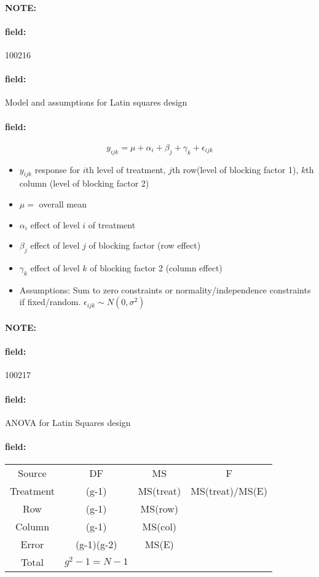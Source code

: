 \documentclass[12pt]{article}
\newenvironment{note}{\paragraph{NOTE:}}{}
\newenvironment{field}{\paragraph{field:}}{}
\begin{document}
\begin{note}
    \begin{field}
        \tiny 100216
    \end{field}
    \begin{field}
        Model and assumptions for Latin squares design
    \end{field}
    \begin{field}
        $$y_{ijk} = \mu +\alpha_i + \beta_j + \gamma_k + \epsilon_{ijk} $$
        \begin{itemize}
          \item $y_{ijk}$ response for $i$th level of treatment, $j$th row(level of blocking factor 1), $k$th column (level of blocking factor 2)
          \item $\mu = $ overall mean
          \item $\alpha_i$ effect of level $i$ of treatment
          \item $\beta_j$ effect of level $j$ of blocking factor (row effect)
          \item $\gamma_k$ effect of level $k$ of blocking factor 2 (column effect)
          \item Assumptions: Sum to zero constraints or normality/independence constraints if fixed/random. $\epsilon_{ijk} \sim N(0,\sigma^2)$
        \end{itemize}
    \end{field}
\end{note}

\begin{note}
    \begin{field}
        \tiny 100217
    \end{field}
    \begin{field}
        ANOVA for Latin Squares design
    \end{field}
    \begin{field}
        \begin{tabular}{c c c c }
          Source & DF & MS & F \\
          Treatment & (g-1) & MS(treat) & MS(treat)/MS(E)\\
          Row & (g-1) & MS(row) & \\
          Column & (g-1) & MS(col) & \\
          Error & (g-1)(g-2) & MS(E) & \\
          Total & $g^2-1= N-1$ & &
        \end{tabular}
    \end{field}
\end{note}
\end{document}
